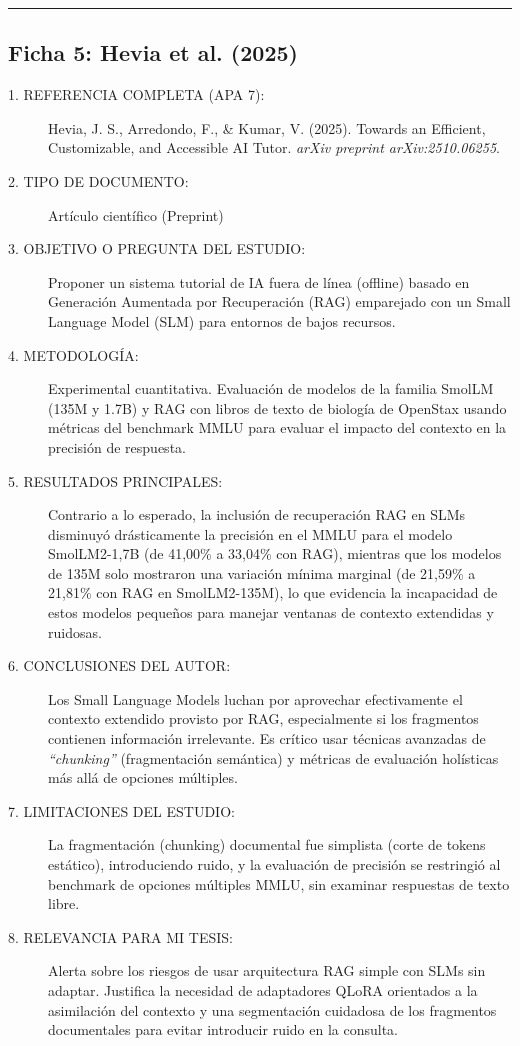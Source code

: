 \vspace{0.5cm}
\hrule
\vspace{0.5cm}

\subsection*{Ficha 5: Hevia et al. (2025)}
\begin{description}
	\item[1. REFERENCIA COMPLETA (APA 7):] Hevia, J. S., Arredondo, F., \& Kumar, V. (2025). Towards an Efficient, Customizable, and Accessible AI Tutor. \textit{arXiv preprint arXiv:2510.06255}.
	\item[2. TIPO DE DOCUMENTO:] Artículo científico (Preprint)
	\item[3. OBJETIVO O PREGUNTA DEL ESTUDIO:] Proponer un sistema tutorial de IA fuera de línea (offline) basado en Generación Aumentada por Recuperación (RAG) emparejado con un Small Language Model (SLM) para entornos de bajos recursos.
	\item[4. METODOLOGÍA:] Experimental cuantitativa. Evaluación de modelos de la familia SmolLM (135M y 1.7B) y RAG con libros de texto de biología de OpenStax usando métricas del benchmark MMLU para evaluar el impacto del contexto en la precisión de respuesta.
	\item[5. RESULTADOS PRINCIPALES:] Contrario a lo esperado, la inclusión de recuperación RAG en SLMs disminuyó drásticamente la precisión en el MMLU para el modelo SmolLM2-1,7B (de 41,00\% a 33,04\% con RAG), mientras que los modelos de 135M solo mostraron una variación mínima marginal (de 21,59\% a 21,81\% con RAG en SmolLM2-135M), lo que evidencia la incapacidad de estos modelos pequeños para manejar ventanas de contexto extendidas y ruidosas.
	\item[6. CONCLUSIONES DEL AUTOR:] Los Small Language Models luchan por aprovechar efectivamente el contexto extendido provisto por RAG, especialmente si los fragmentos contienen información irrelevante. Es crítico usar técnicas avanzadas de \foreignlanguage{english}{\textit{``chunking''}} (fragmentación semántica) y métricas de evaluación holísticas más allá de opciones múltiples.
	\item[7. LIMITACIONES DEL ESTUDIO:] La fragmentación (chunking) documental fue simplista (corte de tokens estático), introduciendo ruido, y la evaluación de precisión se restringió al benchmark de opciones múltiples MMLU, sin examinar respuestas de texto libre.
	\item[8. RELEVANCIA PARA MI TESIS:] Alerta sobre los riesgos de usar arquitectura RAG simple con SLMs sin adaptar. Justifica la necesidad de adaptadores QLoRA orientados a la asimilación del contexto y una segmentación cuidadosa de los fragmentos documentales para evitar introducir ruido en la consulta.

\end{description}
